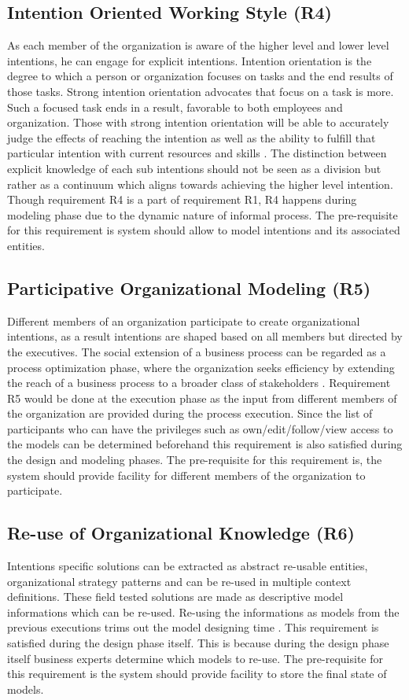\subsection{Intention Oriented Working Style (R4)}
As each member of the organization is aware of the higher level and lower level intentions, he can engage for explicit intentions. Intention orientation is the degree to which a person or organization focuses on tasks and the end results of those tasks. Strong intention orientation advocates that focus on a task is more. Such a focused task ends in a result, favorable to both employees and organization. Those with strong intention orientation will be able to accurately judge the effects of reaching the intention as well as the ability to fulfill that particular intention with current resources and skills \cite{Lacom}. The distinction between explicit knowledge of each sub intentions should not be seen as a division but rather as a continuum which aligns towards achieving the higher level intention. Though requirement R4 is a part of requirement R1, R4 happens during modeling phase due to the dynamic nature of informal process. The pre-requisite for this requirement is system should allow to model intentions and its associated entities. 

\subsection{Participative Organizational Modeling (R5)}
 Different members of an organization participate to create organizational intentions, as a result intentions are shaped based on all members but directed by the executives. The  social  extension  of  a  business  process  can  be  regarded  as  a  process optimization phase, where the organization seeks efficiency  by  extending  the  reach  of  a  business  process  to  a  broader  class  of  stakeholders \cite{Brambilla2012}. Requirement R5 would be done at the execution phase as the input from different members of the organization are provided during the process execution. Since the list of participants who can have the privileges such as own/edit/follow/view access to the models can be determined beforehand this requirement is also satisfied during the design and modeling phases. The pre-requisite for this requirement is, the system should provide facility for different members of the organization to participate. 
 
 \subsection{Re-use of Organizational Knowledge (R6)}
 Intentions specific solutions can be extracted as abstract re-usable entities, organizational strategy patterns and can be re-used in multiple context definitions. These field tested solutions are made as descriptive model informations which can be re-used.  Re-using the informations as models from the previous executions trims out the model designing time \cite{Yu2000}. This requirement is satisfied during the design phase itself. This is because during the design phase itself business experts determine which models to re-use. The pre-requisite for this requirement is the system should provide facility to store the final state of models.

